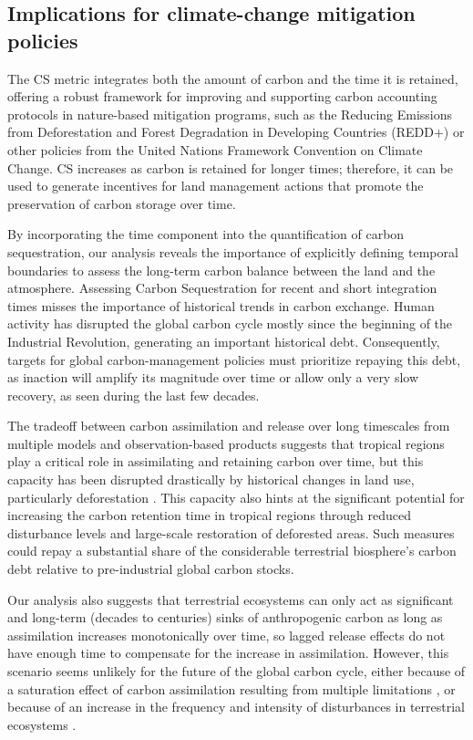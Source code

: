 \documentclass[ProofPDF]{./Styles/Jnls-Template-V3}
\begin{document}
\subsection{Implications for climate-change mitigation policies}

The CS metric integrates both the amount of carbon and the time it is retained, offering a robust framework for improving and supporting carbon accounting protocols in nature-based mitigation programs, such as the Reducing Emissions from Deforestation and Forest Degradation in Developing Countries (REDD+) or other policies from the United Nations Framework Convention on Climate Change. CS increases as carbon is retained for longer times; therefore, it can be used to generate incentives for land management actions that promote the preservation of carbon storage over time. 

By incorporating the time component into the quantification of carbon sequestration, our analysis reveals the importance of explicitly defining temporal boundaries to assess the long-term carbon balance between the land and the atmosphere. Assessing Carbon Sequestration for recent and short integration times misses the importance of historical trends in carbon exchange. Human activity has disrupted the global carbon cycle mostly since the beginning of the Industrial Revolution, generating an important historical debt. Consequently, targets for global carbon-management policies must prioritize repaying this debt, as inaction will amplify its magnitude over time or allow only a very slow recovery, as seen during the last few decades.

The tradeoff between carbon assimilation and release over long timescales from multiple models and observation-based products suggests that tropical regions play a critical role in assimilating and retaining carbon over time, but this capacity has been disrupted drastically by historical changes in land use, particularly deforestation \citep{Li2022}. This capacity also hints at the significant potential for increasing the carbon retention time in tropical regions through reduced disturbance levels and large-scale restoration of deforested areas. Such measures could repay a substantial share of the considerable terrestrial biosphere's carbon debt relative to pre-industrial global carbon stocks.

Our analysis also suggests that terrestrial ecosystems can only act as significant and long-term (decades to centuries) sinks of anthropogenic carbon as long as assimilation increases monotonically over time, so lagged release effects do not have enough time to compensate for the increase in assimilation. However, this scenario seems unlikely for the future of the global carbon cycle, either because of a saturation effect of carbon assimilation resulting from multiple limitations \citep{Melnikova2021,Friedlingstein2023}, or because of an increase in the frequency and intensity of disturbances in terrestrial ecosystems \citep{Xu2021,Sitch2024}.
\end{document}
